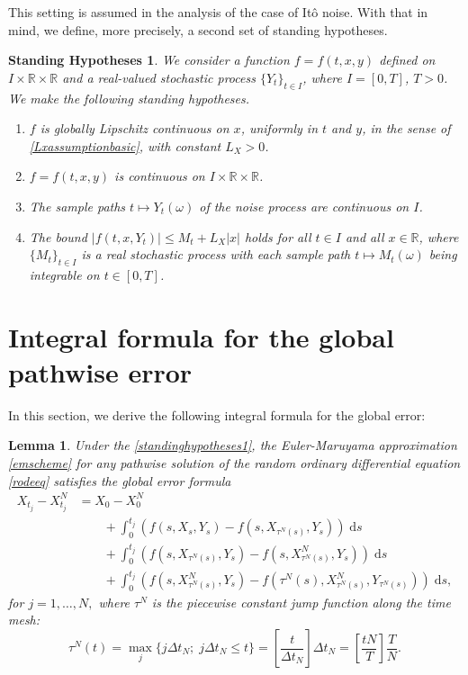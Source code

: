 \documentclass[reqno,12pt]{amsart}
\theoremstyle{plain}%
\newtheorem{lem}{Lemma}[section]
\newtheorem{stdhyp}{Standing Hypotheses}[section]
\theoremstyle{definition}
\begin{document}
This setting is assumed in the analysis of the case of It\^o noise. With that in mind, we define, more precisely, a second set of standing hypotheses.

\begin{stdhyp}
    \label{standinghypotheses2}
    We consider a function $f=f(t, x, y)$ defined on $I\times \mathbb{R}\times\mathbb{R}$ and a real-valued stochastic process $\{Y_t\}_{t\in I}$, where $I=[0, T]$, $T > 0$. We make the following standing hypotheses.
    \begin{enumerate}
        \item $f$ is globally Lipschitz continuous on $x$, uniformly in $t$ and $y$, in the sense of \eqref{Lxassumptionbasic}, with constant $L_X > 0$.
        \item $f = f(t, x, y)$ is continuous on $I\times \mathbb{R}\times \mathbb{R}$.
        \item The sample paths $t\mapsto Y_t(\omega)$ of the noise process are continuous on $I$.
        \item The bound $|f(t, x, Y_t)| \leq M_t + L_X|x|$ holds for all $t\in I$ and all $x\in\mathbb{R}$, where $\{M_t\}_{t\in I}$ is a real stochastic process with each sample path $t\mapsto M_t(\omega)$ being integrable on $t\in [0, T]$.
    \end{enumerate}
\end{stdhyp}

\section{Integral formula for the global pathwise error}

In this section, we derive the following integral formula for the global error:
\begin{lem}
    Under the \cref{standinghypotheses1}, the Euler-Maruyama approximation \eqref{emscheme} for any pathwise solution of the random ordinary differential equation \eqref{rodeeq} satisfies the global error formula
    \begin{equation}
        \label{globalerrorintegralformula}
        \begin{aligned}
            X_{t_j} - X_{t_j}^N & = X_0 - X_0^N \\
            & \qquad + \int_0^{t_j} \left( f(s, X_s, Y_s) - f(s, X_{\tau^N(s)}, Y_s) \right)\;\mathrm{d}s  \\ 
            & \qquad + \int_{0}^{t_j} \left( f(s, X_{\tau^N(s)}, Y_s) - f(s, X_{\tau^N(s)}^N, Y_s) \right)\;\mathrm{d}s \\
            & \qquad + \int_0^{t_j} \left( f(s, X_{\tau^N(s)}^N, Y_s) - f(\tau^N(s), X_{\tau^N(s)}^N, Y_{\tau^N(s)}) \right)\;\mathrm{d}s,
        \end{aligned}
    \end{equation}
    for $j = 1, \ldots, N,$ where $\tau^N$ is the piecewise constant jump function along the time mesh:
    \begin{equation}
        \label{tauNt}
        \tau^N(t) = \max_j\{j\Delta t_N; \; j\Delta t_N \leq t\} = \left[\frac{t}{\Delta t_N}\right]\Delta t_N = \left[\frac{tN}{T}\right]\frac{T}{N}.
    \end{equation}
\end{lem}
\end{document}
